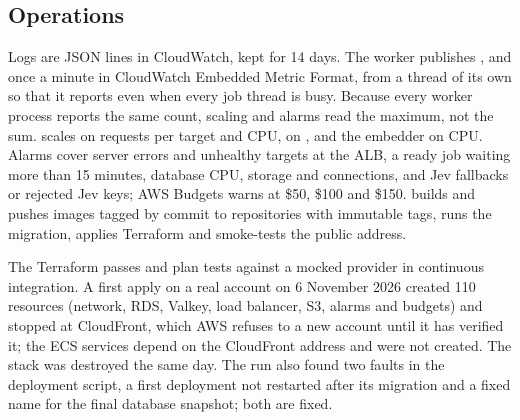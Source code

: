 \subsection{Operations}
Logs are JSON lines in CloudWatch, kept for 14 days. The worker publishes ,  and  once a minute in CloudWatch Embedded Metric Format, from a thread of its own so that it reports even when every job thread is busy. Because every worker process reports the same count, scaling and alarms read the maximum, not the sum.  scales on requests per target and CPU,  on , and the embedder on CPU. Alarms cover server errors and unhealthy targets at the ALB, a ready job waiting more than 15 minutes, database CPU, storage and connections, and Jev fallbacks or rejected Jev keys; AWS Budgets warns at \$50, \$100 and \$150.  builds and pushes images tagged by commit to repositories with immutable tags, runs the migration, applies Terraform and smoke-tests the public address.

The Terraform passes  and plan tests against a mocked provider in continuous integration. A first apply on a real account on 6 November 2026 created 110 resources (network, RDS, Valkey, load balancer, S3, alarms and budgets) and stopped at CloudFront, which AWS refuses to a new account until it has verified it; the ECS services depend on the CloudFront address and were not created. The stack was destroyed the same day. The run also found two faults in the deployment script, a first deployment not restarted after its migration and a fixed name for the final database snapshot; both are fixed.
